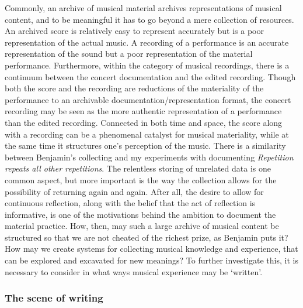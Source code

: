 Commonly, an archive of musical material archives representations of
musical content, and to be meaningful it has to go beyond a mere
collection of resources. An archived score is relatively easy to
represent accurately but is a poor representation of the actual music. A
recording of a performance is an accurate representation of the sound
but a poor representation of the material performance. Furthermore,
within the category of musical recordings, there is a continuum between
the concert documentation and the edited recording. Though both the
score and the recording are reductions of the materiality of the
performance to an archivable documentation/representation format, the
concert recording may be seen as the more authentic representation of a
performance than the edited recording. Connected in both time and space,
the score along with a recording can be a phenomenal catalyst for
musical materiality, while at the same time it structures one's
perception of the music. There is a similarity between Benjamin's
collecting and my experiments with documenting \emph{Repetition repeats
all other repetitions}. The relentless storing of unrelated data is one
common aspect, but more important is the way the collection allows for
the possibility of returning again and again. After all, the desire to
allow for continuous reflection, along with the belief that the act of
reflection is informative, is one of the motivations behind the ambition
to document the material practice. How, then, may such a large archive
of musical content be structured so that we are not cheated of the
richest prize, as Benjamin puts it? How may we create systems for
collecting musical knowledge and experience, that can be explored and
excavated for new meanings? To further investigate this, it is necessary
to consider in what ways musical experience may be `written'.

\hypertarget{the-scene-of-writing}{%
\subsubsection{The scene of writing}\label{the-scene-of-writing}}

